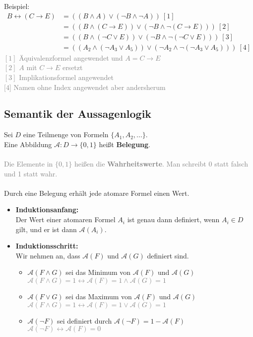 \documentclass{article}
\begin{document}
	Beispiel:
	\begin{align*}
		B \leftrightarrow (C \rightarrow E) &= ((B \wedge A)\vee(\neg B \wedge \neg A)) \: [1]\\
		&= ((B \wedge (C \rightarrow E))\vee(\neg B \wedge \neg (C \rightarrow E))) \: [2] \\
		&= ((B \wedge (\neg C \vee E))\vee(\neg B \wedge \neg (\neg C \vee E))) \: [3]\\
		&= ((A_2 \wedge (\neg A_3 \vee A_5))\vee(\neg A_2 \wedge \neg (\neg A_3 \vee A_5))) \: [4]
	\end{align*}
	\textcolor{gray}{
		$[1]$ Äquivalenzformel angewendet und $A = C \rightarrow E$ \\
		$[2]$ $A$ mit $C \rightarrow E$ ersetzt \\
		$[3]$ Implikationsformel angewendet \\
		$[4$] Namen ohne Index angewendet aber andersherum
	}
	
	\subsection{Semantik der Aussagenlogik}
	Sei $D$ eine Teilmenge von Formeln $\{A_1, A_2, ...\}$. \\
	Eine Abbildung $\mathcal{A}: D \rightarrow \{0,1\}$ heißt \textbf{Belegung}.\\ 
	\\
	\textcolor{gray}{Die Elemente in $\{0,1\}$ heißen die \textbf{Wahrheitswerte}. Man schreibt 0 statt falsch und 1 statt wahr.}  \\
	\\
	Durch eine Belegung erhält jede atomare Formel einen Wert. 
	\begin{itemize}
		\item \textbf{Induktionsanfang:} \\
		Der Wert einer atomaren Formel $A_i$ ist genau dann definiert, wenn $A_i \in D$ gilt, und er ist dann $\mathcal{A}(A_i)$.
		\item \textbf{Induktionsschritt:} \\
		Wir nehmen an, dass $\mathcal{A}(F)$ und $\mathcal{A}(G)$ definiert sind.
		\begin{itemize}
			\item $\mathcal{A}(F \wedge G)$ sei das Minimum von $\mathcal{A}(F)$ und $\mathcal{A}(G)$ \\
			\textcolor{gray}{$\mathcal{A}(F \wedge G) = 1 \leftrightarrow \mathcal{A}(F) = 1 \wedge \mathcal{A}(G) = 1$}
			\item $\mathcal{A}(F \vee G)$ sei das Maximum von $\mathcal{A}(F)$ und $\mathcal{A}(G)$ \\
			\textcolor{gray}{$\mathcal{A}(F \wedge G) = 1 \leftrightarrow \mathcal{A}(F) = 1 \vee \mathcal{A}(G) = 1$}
			\item $\mathcal{A}(\neg F)$ sei definiert durch $\mathcal{A}(\neg F) = 1 - \mathcal{A}(F)$
			\textcolor{gray}{$\mathcal{A}(\neg F) \leftrightarrow \mathcal{A}(F) = 0$}
		\end{itemize}
	\end{itemize}
\end{document}
